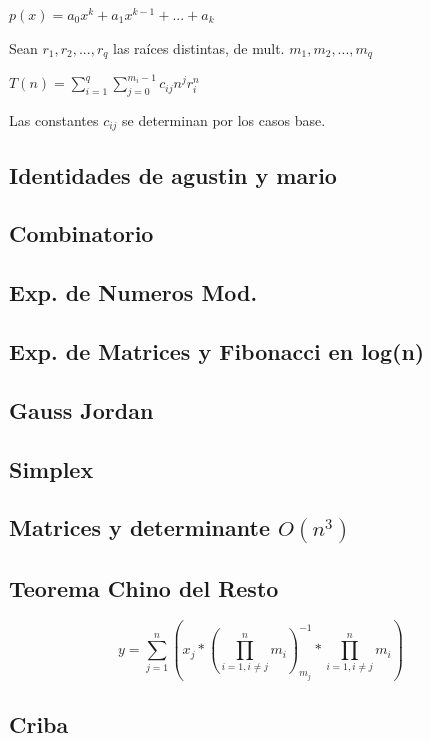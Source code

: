 $p(x)=a_0 x^k + a_1 x^{k-1} + ... + a_k$

Sean $r_1,r_2,...,r_q$ las raíces distintas, de mult. $m_1, m_2, ..., m_q$

$T(n)=\sum_{i=1}^q{\sum_{j=0}^{m_i - 1}c_{ij} n^j r_i^n}$

Las constantes $c_{ij}$ se determinan por los casos base.

\subsection{Identidades de agustin y mario}


\subsection{Combinatorio}

\subsection{Exp. de Numeros Mod.}

\subsection{Exp. de Matrices y Fibonacci en log(n)}

\subsection{Gauss Jordan}
\subsection{Simplex}


\subsection{Matrices y determinante $O(n^3)$}

\subsection{Teorema Chino del Resto}
$$y=\sum_{j=1}^n (x_j*(\prod_{i=1, i\neq j}^n m_i)_{m_j}^{-1}*\prod_{i=1, i\neq j}^n m_i)$$
\subsection{Criba}
